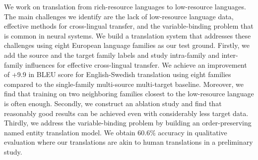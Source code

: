 We work on translation from rich-resource languages to low-resource languages. The main challenges we identify are the lack of low-resource language data, effective methods for cross-lingual transfer, and the variable-binding problem that is common in neural systems. We build a translation system that addresses these challenges using eight European language families as our test ground. Firstly, we add the source and the target family labels and study intra-family and inter-family influences for effective cross-lingual transfer. We achieve an improvement of +9.9 in BLEU score for English-Swedish translation using eight families compared to the single-family multi-source multi-target baseline. Moreover, we find that training on two neighboring families closest to the low-resource language is often enough. Secondly, we construct an ablation study and find that reasonably good results can be achieved even with considerably less target data. Thirdly, we address the variable-binding problem by building an order-preserving named entity translation model. We obtain 60.6\% accuracy in qualitative evaluation where our translations are akin to human translations in a preliminary study.
